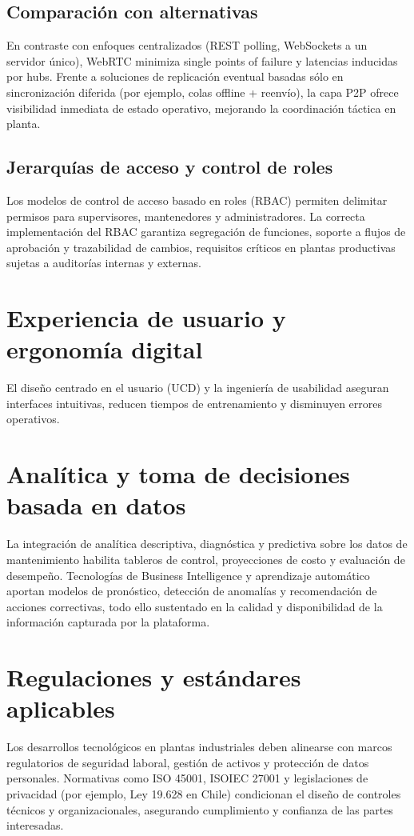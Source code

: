\documentclass[12pt,a4paper]{report}
\begin{document}
\subsection*{Comparación con alternativas}
En contraste con enfoques centralizados (REST polling, WebSockets a un servidor único), WebRTC minimiza single points of failure y latencias inducidas por hubs. Frente a soluciones de replicación eventual basadas sólo en sincronización diferida (por ejemplo, colas offline + reenvío), la capa P2P ofrece visibilidad inmediata de estado operativo, mejorando la coordinación táctica en planta.

\subsection*{Jerarquías de acceso y control de roles}
Los modelos de control de acceso basado en roles (RBAC) permiten delimitar permisos para supervisores, mantenedores y administradores. La correcta implementación del RBAC garantiza segregación de funciones, soporte a flujos de aprobación y trazabilidad de cambios, requisitos críticos en plantas productivas sujetas a auditorías internas y externas.

\section*{Experiencia de usuario y ergonomía digital}
El diseño centrado en el usuario (UCD) y la ingeniería de usabilidad aseguran interfaces intuitivas, reducen tiempos de entrenamiento y disminuyen errores operativos.

\section*{Analítica y toma de decisiones basada en datos}
La integración de analítica descriptiva, diagnóstica y predictiva sobre los datos de mantenimiento habilita tableros de control, proyecciones de costo y evaluación de desempeño. Tecnologías de Business Intelligence y aprendizaje automático aportan modelos de pronóstico, detección de anomalías y recomendación de acciones correctivas, todo ello sustentado en la calidad y disponibilidad de la información capturada por la plataforma.

\section*{Regulaciones y estándares aplicables}
Los desarrollos tecnológicos en plantas industriales deben alinearse con marcos regulatorios de seguridad laboral, gestión de activos y protección de datos personales. Normativas como ISO 45001, ISO\/IEC 27001 y legislaciones de privacidad (por ejemplo, Ley 19.628 en Chile) condicionan el diseño de controles técnicos y organizacionales, asegurando cumplimiento y confianza de las partes interesadas.
\end{document}
